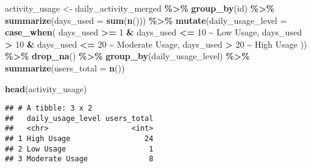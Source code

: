 \documentclass[
]{article}
\newenvironment{Shaded}{\begin{snugshade}}{\end{snugshade}}
\newcommand{\AttributeTok}[1]{\textcolor[rgb]{0.13,0.29,0.53}{#1}}
\newcommand{\DecValTok}[1]{\textcolor[rgb]{0.00,0.00,0.81}{#1}}
\newcommand{\FunctionTok}[1]{\textcolor[rgb]{0.13,0.29,0.53}{\textbf{#1}}}
\newcommand{\NormalTok}[1]{#1}
\newcommand{\OtherTok}[1]{\textcolor[rgb]{0.56,0.35,0.01}{#1}}
\newcommand{\SpecialCharTok}[1]{\textcolor[rgb]{0.81,0.36,0.00}{\textbf{#1}}}
\newcommand{\StringTok}[1]{\textcolor[rgb]{0.31,0.60,0.02}{#1}}
\begin{document}
\begin{Shaded}
\begin{Highlighting}[]
\NormalTok{activity\_usage }\OtherTok{\textless{}{-}}\NormalTok{ daily\_activity\_merged }\SpecialCharTok{\%\textgreater{}\%} 
 \FunctionTok{group\_by}\NormalTok{(id) }\SpecialCharTok{\%\textgreater{}\%} 
 \FunctionTok{summarize}\NormalTok{(}\AttributeTok{days\_used =} \FunctionTok{sum}\NormalTok{(}\FunctionTok{n}\NormalTok{())) }\SpecialCharTok{\%\textgreater{}\%} 
 \FunctionTok{mutate}\NormalTok{(}\AttributeTok{daily\_usage\_level =} \FunctionTok{case\_when}\NormalTok{(}
\NormalTok{   days\_used }\SpecialCharTok{\textgreater{}=} \DecValTok{1} \SpecialCharTok{\&}\NormalTok{ days\_used }\SpecialCharTok{\textless{}=} \DecValTok{10} \SpecialCharTok{\textasciitilde{}} \StringTok{\textquotesingle{}Low Usage\textquotesingle{}}\NormalTok{,}
\NormalTok{   days\_used }\SpecialCharTok{\textgreater{}} \DecValTok{10} \SpecialCharTok{\&}\NormalTok{ days\_used }\SpecialCharTok{\textless{}=} \DecValTok{20} \SpecialCharTok{\textasciitilde{}} \StringTok{\textquotesingle{}Moderate Usage\textquotesingle{}}\NormalTok{,}
\NormalTok{   days\_used }\SpecialCharTok{\textgreater{}} \DecValTok{20} \SpecialCharTok{\textasciitilde{}} \StringTok{\textquotesingle{}High Usage\textquotesingle{}}
\NormalTok{ )) }\SpecialCharTok{\%\textgreater{}\%} 
 \FunctionTok{drop\_na}\NormalTok{() }\SpecialCharTok{\%\textgreater{}\%} 
 \FunctionTok{group\_by}\NormalTok{(daily\_usage\_level) }\SpecialCharTok{\%\textgreater{}\%} 
 \FunctionTok{summarize}\NormalTok{(}\AttributeTok{users\_total =} \FunctionTok{n}\NormalTok{())}

\FunctionTok{head}\NormalTok{(activity\_usage)}
\end{Highlighting}
\end{Shaded}

\begin{verbatim}
## # A tibble: 3 x 2
##   daily_usage_level users_total
##   <chr>                   <int>
## 1 High Usage                 24
## 2 Low Usage                   1
## 3 Moderate Usage              8
\end{verbatim}
\end{document}
